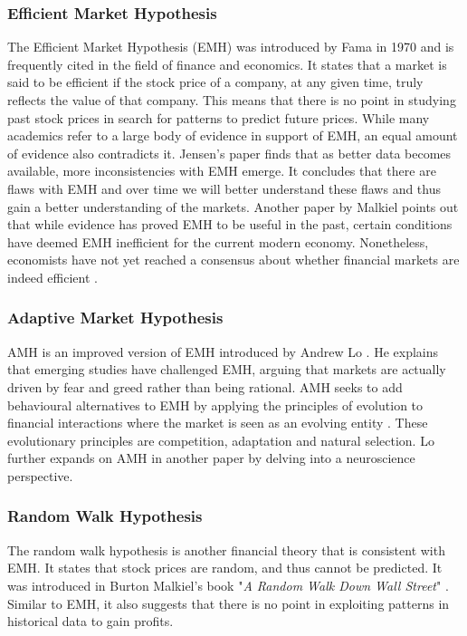 \documentclass{UoYCSproject}
\begin{document}
\subsubsection{Efficient Market Hypothesis}
The Efficient Market Hypothesis (EMH) was introduced by Fama in 1970  \cite{malkiel1970efficient} and is frequently cited in the field of finance and economics. It states that a market is said to be efficient if the stock price of a company, at any given time, truly reflects the value of that company. This means that there is no point in studying past stock prices in search for patterns to predict future prices. While many academics refer to a large body of evidence in support of EMH, an equal amount of evidence also contradicts it. Jensen's \cite{jensen1978some} paper finds that as better data becomes available, more inconsistencies with EMH emerge. It concludes that there are flaws with EMH and over time we will better understand these flaws and thus gain a better understanding of the markets. Another paper by Malkiel \cite{malkiel2003efficient} points out that while evidence has proved EMH to be useful in the past, certain conditions have deemed EMH inefficient for the current modern economy. Nonetheless, economists have not yet reached a consensus about whether financial markets are indeed efficient \cite{lo2004adaptive}.  

\subsubsection{Adaptive Market Hypothesis}
AMH is an improved version of EMH introduced by Andrew Lo \cite{lo2004adaptive}. He explains that emerging studies have challenged EMH, arguing that markets are actually driven by fear and greed rather than being rational. AMH seeks to add behavioural alternatives to EMH by applying the principles of evolution to financial interactions where the market is seen as an evolving entity \cite{lo2004adaptive}. These evolutionary principles are competition, adaptation and natural selection. Lo further expands on AMH in another paper \cite{lo2005reconciling}
by delving into a neuroscience perspective.

\subsubsection{Random Walk Hypothesis}
The random walk hypothesis is another financial theory that is consistent with EMH. It states that stock prices are random, and thus cannot be predicted. It was introduced in Burton Malkiel's book "\textit{A Random Walk Down Wall Street}" \cite{malkiel1973random}. Similar to EMH, it also suggests that there is no point in exploiting patterns in historical data to gain profits.  
\end{document}
